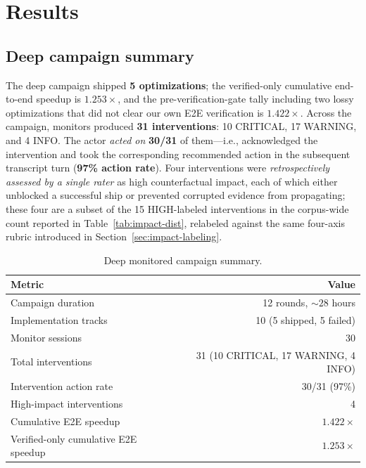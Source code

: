 \documentclass[11pt]{article}
\begin{document}
\section{Results}
\label{sec:results}

\subsection{Deep campaign summary}

The deep campaign shipped \textbf{5 optimizations}; the verified-only cumulative end-to-end speedup is \textbf{$1.253\times$}, and the pre-verification-gate tally including two lossy optimizations that did not clear our own E2E verification is \textbf{$1.422\times$}. Across the campaign, monitors produced \textbf{31 interventions}: 10 CRITICAL, 17 WARNING, and 4 INFO. The actor \emph{acted on} \textbf{30/31} of them---i.e., acknowledged the intervention and took the corresponding recommended action in the subsequent transcript turn (\textbf{97\% action rate}). Four interventions were \emph{retrospectively assessed by a single rater} as high counterfactual impact, each of which either unblocked a successful ship or prevented corrupted evidence from propagating; these four are a subset of the 15 HIGH-labeled interventions in the corpus-wide count reported in Table~\ref{tab:impact-dist}, relabeled against the same four-axis rubric introduced in Section~\ref{sec:impact-labeling}.

\begin{table}[h]
\centering
\caption{Deep monitored campaign summary.}
\label{tab:deep-summary}
\small
\begin{tabular}{@{}lr@{}}
\toprule
\textbf{Metric} & \textbf{Value} \\
\midrule
Campaign duration & 12 rounds, ${\sim}28$ hours \\
Implementation tracks & 10 (5 shipped, 5 failed) \\
Monitor sessions & 30 \\
Total interventions & 31 (10 CRITICAL, 17 WARNING, 4 INFO) \\
Intervention action rate & 30/31 (97\%) \\
High-impact interventions & 4 \\
Cumulative E2E speedup & $1.422\times$ \\
Verified-only cumulative E2E speedup & $1.253\times$ \\
\bottomrule
\end{tabular}
\end{table}
\end{document}

